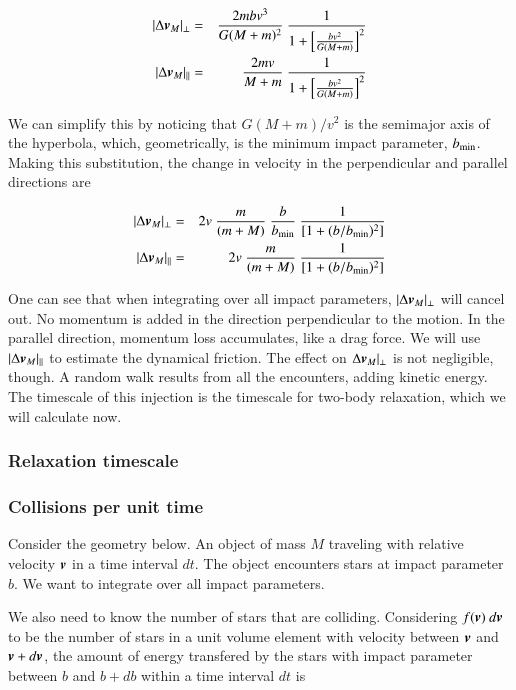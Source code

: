 \begin{eqnarray}
|\Delta \v{v}_{M}|_\perp &=& \frac{2mbv^3}{G(M+m)^2} \ \frac{1}{1+  \left[\frac{bv^2}{G(M+m)}\right]^2       }\\
|\Delta \v{v}_{M}|_{||} &=& \frac{2mv}{M+m} \ \frac{1}{ 1+  \left[\frac{bv^2}{G(M+m)}\right]^2   }
\end{eqnarray}

We can simplify this by noticing that $G(M+m)/v^2$ is the semimajor axis of the hyperbola, which, geometrically, is the minimum impact parameter, $b_{\rm min}$. Making this substitution, the change in velocity in the perpendicular and parallel directions are 


\begin{eqnarray}
|\Delta \v{v}_{M}|_\perp &=& 2v \ \frac{m}{(m+M)} \ \frac{b}{b_{\rm min}}\ \frac{1}{[1+(b/b_{\rm min})^2]}\\
|\Delta \v{v}_{M}|_{||} &=& 2v \ \frac{m}{(m+M)} \ \frac{1}{[1+(b/b_{\rm min})^2]}
\end{eqnarray}

One can see that when integrating over all impact parameters, $|\Delta {\boldsymbol{v}}_{M}|_\perp$ will cancel out. No momentum is added in the direction perpendicular to the motion. In the parallel direction, momentum loss accumulates, like a drag force. We will use $|\Delta {\boldsymbol{v}}_{M}|_{||}$ to estimate the dynamical friction. The effect on $\Delta {\boldsymbol{v}}_{M}|_\perp$ is not negligible, though. A random walk results from all the encounters, adding kinetic energy. The timescale of this injection is the timescale for two-body relaxation, which we will calculate now. 


\subsubsection{Relaxation timescale}

\subsubsection{Collisions per unit time}

Consider the geometry below. An object of mass $M$ traveling with relative velocity ${\boldsymbol{v}}$ in a time interval $dt$. The object encounters stars at impact parameter $b$. We want to integrate over all impact parameters.

We also need to know the number of stars that are colliding. Considering $f({\boldsymbol{v}}) \ d{\boldsymbol{v}}$ to be the number of stars in a unit volume element with velocity between ${\boldsymbol{v}}$ and ${\boldsymbol{v}}+d{\boldsymbol{v}}$, the amount of energy transfered by the stars with impact parameter between $b$ and $b+db$ within a time interval $dt$ is 

